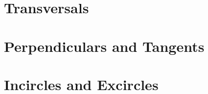 \documentclass{memoir}
\begin{document}
  \section{Transversals}
    
    \newpage

  \section{Perpendiculars and Tangents}
    
    \newpage

  \section{Incircles and Excircles}
    

\backmatter
  \printindex
\end{document}
